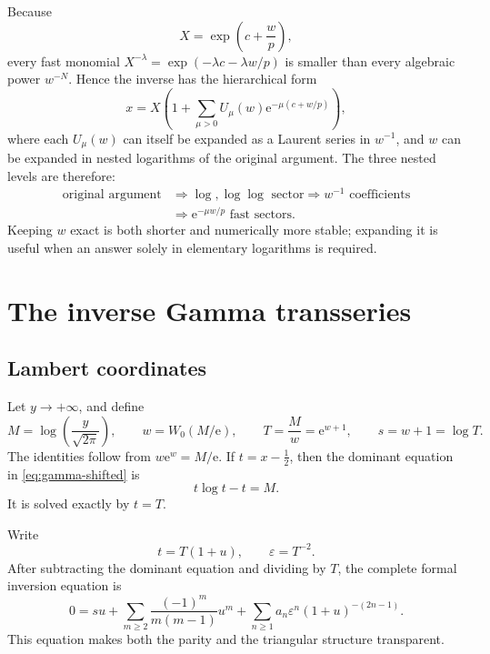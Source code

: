 \documentclass[11pt]{article}
\theoremstyle{definition}
\theoremstyle{remark}
\newcommand{\e}{\mathrm e}
\begin{document}
Because
\[
 X=\exp\!\left(c+\frac{w}{p}\right),
\]
every fast monomial \(X^{-\lambda}=\exp(-\lambda c-\lambda w/p)\) is smaller than every algebraic power \(w^{-N}\).  Hence the inverse has the hierarchical form
\begin{equation}\label{eq:two-level}
 x=X\left(1+
 \sum_{\mu>0}U_\mu(w)\e^{-\mu(c+w/p)}\right),
\end{equation}
where each \(U_\mu(w)\) can itself be expanded as a Laurent series in \(w^{-1}\), and \(w\) can be expanded in nested logarithms of the original argument.  The three nested levels are therefore:
\[
 \begin{aligned}
 \text{original argument}&\Longrightarrow \log,\log\log\text{ sector}
 \Longrightarrow w^{-1}\text{ coefficients}\\
 &\Longrightarrow \e^{-\mu w/p}\text{ fast sectors}.
 \end{aligned}
\]
Keeping \(w\) exact is both shorter and numerically more stable; expanding it is useful when an answer solely in elementary logarithms is required.

\section{The inverse Gamma transseries}\label{sec:gamma}

\subsection{Lambert coordinates}

Let \(y\to+\infty\), and define
\begin{equation}\label{eq:gamma-scales}
 M=\log\!\left(\frac{y}{\sqrt{2\pi}}\right),\qquad
 w=W_0(M/\e),\qquad
 T=\frac{M}{w}=\e^{w+1},\qquad
 s=w+1=\log T.
\end{equation}
The identities follow from \(w\e^w=M/\e\).  If \(t=x-\tfrac12\), then the dominant equation in \cref{eq:gamma-shifted} is
\[
 t\log t-t=M.
\]
It is solved exactly by \(t=T\).

Write
\begin{equation}\label{eq:gamma-u}
 t=T(1+u),\qquad \varepsilon=T^{-2}.
\end{equation}
After subtracting the dominant equation and dividing by \(T\), the complete formal inversion equation is
\begin{equation}\label{eq:gamma-rec-equation}
 0=su+
 \sum_{m\ge2}\frac{(-1)^m}{m(m-1)}u^m
 +\sum_{n\ge1}a_n\varepsilon^n(1+u)^{-(2n-1)}.
\end{equation}
This equation makes both the parity and the triangular structure transparent.
\end{document}
